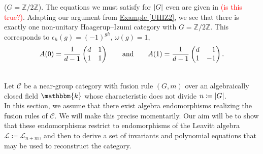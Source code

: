 \noindent\begin{example}\textup{($G = \mathbb{Z}/2\mathbb{Z}$).} The equations we must satisfy for $\lvert G\rvert$ even are given in \cite{Izu18} \textcolor{red}{(is this true?)}. Adapting our argument from \hyperref[UHIZ2]{Example \ref*{UHIZ2}}, we see that there is exactly one non-unitary Haagerup--Izumi category with $G = \mathbb{Z}/2\mathbb{Z}$. This corresponds to $\epsilon_h(g) = (-1)^{gh}$, $\omega(g) = 1$,
\begin{align*}
\begin{split}
A(0) = \frac{1}{d-1}\begin{pmatrix}d & 1\\ 1 & 1\end{pmatrix}\qquad\text{and}\qquad A(1) = \frac{1}{d-1}\begin{pmatrix}d & \hphantom{-}1\\ 1 & -1\end{pmatrix}.
\end{split}
\end{align*}
\end{example}
\newpage

\noindent\\ Let $\mathcal{C}$ be a near-group category with fusion rule $(G, m)$ over an algebraically closed field $\mathbbm{k}$ whose characteristic does not divide $n \coloneqq \lvert G\rvert$.\\ %

\noindent In this section, we assume that there exist algebra endomorphisms realizing the fusion rules of $\mathcal{C}$. We will make this precise momentarily. Our aim will be to show that these endomorphisms restrict to endomorphisms of the Leavitt algebra $\mathcal{L} \coloneqq \mathcal{L}_{n+m}$, and then to derive a set of invariants and polynomial equations that may be used to reconstruct the category.\\


